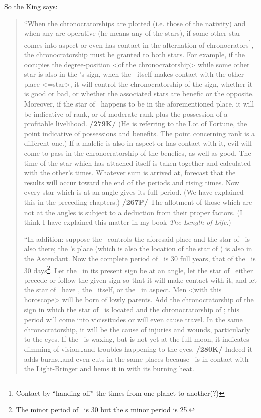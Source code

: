  
So the King says:
\begin{quote}
“When the chronocratorships are plotted (i.e. those of the nativity) and when any are operative (he means any of the stars), if some other star comes into aspect or even has contact in the alternation of
chronocrators\footnote{Contact by ``handing off'' the times from one planet to another(?)}, the chronocratorship must be granted to both stars. For example, if the \Moon\, occupies the degree-position <of the chronocratorship> while some other star is also in the \Moon’s
sign, when the \Moon\, itself makes contact with the other place <=star>, it will control the chronocratorship of the sign, whether it is good or bad, or whether the associated stars are benefic or
the opposite. Moreover, if the star of \Jupiter\, happens to be in the aforementioned place, it will be indicative of rank, or of moderate rank plus the possession of a profitable livelihood. \textbf{/279K/} (He is
referring to the Lot of Fortune, the point indicative of possessions and benefits. The point concerning rank is a different one.) If a malefic is also in aspect or has contact with it, evil will come to pass in the chronocratorship of the benefics, as well as good. The time of the star which has attached itself is taken together and calculated with the other’s times. Whatever sum is arrived at, forecast that the results will occur toward the end of the periods and rising times. Now every star
which is at an angle gives its full period. (We have explained this in the preceding chapters.) \textbf{/267P/} The allotment of those which are not at the angles is subject to a deduction from their proper factors. (I think I have explained this matter in my book \textit{The Length of Life}.)

“In addition: suppose the \Moon\, controls the aforesaid place and the star of \Saturn\, is also there; the \Moon’s place (which is also the location of the star of \Saturn) is also in the Ascendant. Now the
complete period of \Saturn\, is 30 full years, that of the \Moon\, is 30 days\footnote{The minor period of \Saturn\, is 30 but the \Moon
s minor period is 25.}. Let the \Moon\, in its present sign be at an angle, let the star of \Mars\, either precede or follow the given sign so that it will make contact with it, and let the star of \Saturn\, have \Mars, the \Moon\, itself, or the \Sun\, in aspect. Men <with this horoscope> will be born of lowly parents. Add the chronocratorship of the sign in which the star of \Saturn\, is located and the chronocratorship of \Mars; this period will come into vicissitudes or will even cause travel. In the same chronocratorship, it will be the cause of injuries and wounds, particularly to the eyes. If the \Moon\, is waxing, but is not yet at the full moon, it indicates dimming of vision…and troubles happening to the eyes. \textbf{/280K/} Indeed it adds burns…and even cuts in the same places because \Mars\, is in contact with the Light-Bringer and hems it in with its burning heat.


\end{quote}
